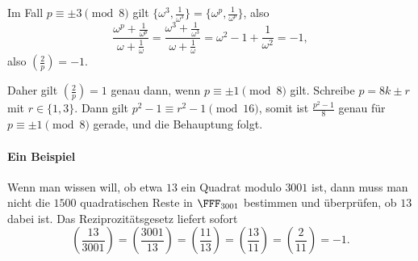 \documentclass[12pt,a4paper,twoside]{article}
\begin{document}
Im Fall $p\equiv\pm3\pmod{8}$ gilt
$\{\omega^3,\frac{1}{\omega^3}\}=\{\omega^p,\frac{1}{\omega^p}\}$, also
\[
\frac{\omega^p+\frac{1}{\omega^p}}{\omega+\frac{1}{\omega}}=
\frac{\omega^3+\frac{1}{\omega^3}}{\omega+\frac{1}{\omega}}=
\omega^2-1+\frac{1}{\omega^2}=-1,
\]
also $\left(\frac{2}{p}\right)=-1$.

Daher gilt $\left(\frac{2}{p}\right)=1$ genau dann, wenn $p\equiv\pm1\pmod{8}$
gilt. Schreibe $p=8k\pm r$ mit $r\in\{1,3\}$. Dann gilt $p^2-1\equiv
r^2-1\pmod{16}$, somit ist $\frac{p^2-1}{8}$ genau f\"ur $p\equiv\pm1\pmod{8}$
gerade, und die Behauptung folgt.
\paragraph{Ein Beispiel}
Wenn man wissen will, ob etwa $13$ ein Quadrat modulo $3001$ ist, dann muss
man nicht die $1500$ quadratischen Reste in $\FFF_{3001}$ bestimmen und
\"uberpr\"ufen, ob $13$ dabei ist. Das Reziprozit\"atsgesetz liefert sofort
\[
\left(\frac{13}{3001}\right)=
\left(\frac{3001}{13}\right)=
\left(\frac{11}{13}\right)=
\left(\frac{13}{11}\right)=
\left(\frac{2}{11}\right)=
-1.
\]
\end{document}
